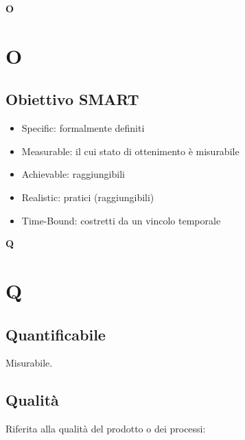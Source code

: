	{\Huge{\textbf{O}}} \\
	\section{O}
		
	\subsection{Obiettivo SMART}
	\label{sec:smart}
	\begin{itemize}  
	\item Specific: formalmente definiti
	\item Measurable: il cui stato di ottenimento è misurabile
	\item Achievable: raggiungibili
	\item Realistic: pratici (raggiungibili)
	\item Time-Bound: costretti da un vincolo temporale
	\end{itemize}\newpage

	{\Huge{\textbf{Q}}} \\
	\section{Q}
	
	\subsection{Quantificabile}
	\label{sec:quantificabile}
	Misurabile.
	
	\subsection{Qualità} 
	\label{sec:qualita}
	Riferita alla qualità del prodotto o dei processi:
